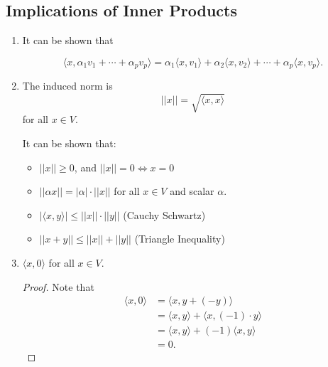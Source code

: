 \documentclass[12pt]{article}
\theoremstyle{definition}
\begin{document}
\subsection{Implications of Inner Products}

\begin{enumerate}[label = (\roman*)]
\item It can be shown that

\[\langle x, \alpha_1 v_1 + \cdots + \alpha_p v_p \rangle = \alpha_1 \langle x, v_1 \rangle +
\alpha_2 \langle x, v_2 \rangle + \cdots + \alpha_p \langle x, v_p \rangle.
\]
\item The induced norm is
\[ ||x|| = \sqrt{\langle x, x \rangle}\]
for all $x \in V$.

It can be shown that:
\begin{itemize}
\item $||x|| \geq 0$, and $||x|| = 0 \iff x = 0$
\item $||\alpha x|| = |\alpha| \cdot ||x||$ for all $x \in V$ and scalar $\alpha$.
\item $|\langle x, y \rangle | \leq ||x|| \cdot ||y||$ (Cauchy Schwartz)
\item $||x + y|| \leq ||x|| + ||y||$ (Triangle Inequality)
\end{itemize}

\item $\langle x, 0 \rangle$ for all $x \in V$.
\begin{proof}
Note that
\begin{align*}
\langle x, 0 \rangle &= \langle x, y + (-y) \rangle \\
&= \langle x, y \rangle + \langle x, (-1) \cdot y \rangle \\
&= \langle x, y \rangle + (-1) \langle x, y \rangle \\
&= 0.
\end{align*}
\end{proof}

\end{enumerate}
\end{document}
